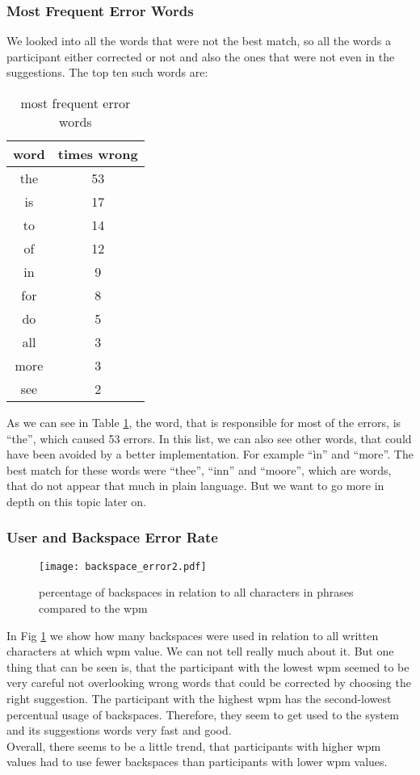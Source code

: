 \subsubsection{Most Frequent Error Words}
We looked into all the words that were not the best match, so all the words a participant either corrected or not and also the ones that were not even in the suggestions. The top ten such words are:
\begin{table}[H]
    \centering
    \caption{most frequent error words}
    \begin{tabular}{cc} \toprule
        word&times wrong\\ \midrule
        the & 53\\
        is & 17\\
        to & 14\\
        of & 12\\
        in & 9\\
        for & 8\\
        do & 5\\
        all & 3\\
        more & 3\\
        see & 2\\
        \bottomrule
    \end{tabular}
    \label{tab:error_words}
\end{table}

As we can see in Table \ref{tab:error_words}, the word, that is responsible for most of the errors, is ``the'', which caused 53 errors. In this list, we can also see other words, that could have been avoided by a better implementation. For example ``ìn'' and ``more''.
The best match for these words were ``thee'', ``inn'' and ``moore'', which are words, that do not appear that much in plain language. But we want to go more in depth on this topic later on.

\subsubsection{User and Backspace Error Rate}
\begin{figure}[H]
    \centering
    \texttt{[image: backspace\_error2.pdf]}
    \caption{percentage of backspaces in relation to all characters in phrases compared to the wpm}
    \label{fig:error_backspace}
\end{figure}

In Fig \ref{fig:error_backspace} we show how many backspaces were used in relation to all written characters at which wpm value. We can not tell really much about it. But one thing that can be seen is, that the participant with the lowest wpm seemed to be very careful not overlooking wrong words that could be corrected by choosing the right suggestion. The participant with the highest wpm has the second-lowest percentual usage of backspaces. Therefore, they seem to get used to the system and its suggestions words very fast and good.\\
Overall, there seems to be a little trend, that participants with higher wpm values had to use fewer backspaces than participants with lower wpm values.\\

